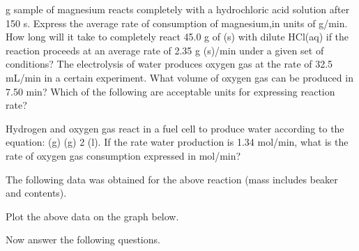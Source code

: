 \documentclass[fleqn]{exam}
\begin{document}
\begin{questions}
   g sample of magnesium reacts completely with a hydrochloric acid solution after 150 s. Express the average rate of consumption of magnesium,in units of g/min.
  \vspace{1in}
  \question How long will it take to completely react 45.0 g of (s) with dilute HCl(aq) if the reaction proceeds at an average rate of 2.35 g (s)/min under a given set of conditions?
  \vspace{1in}
  \question The electrolysis of water produces oxygen gas at the rate of 32.5 mL/min in a certain experiment. What volume of oxygen gas can be produced in 7.50 min?
  \vspace{1in}
  \question Which of the following are acceptable units for expressing reaction rate?

  \question Hydrogen and oxygen gas react in a fuel cell to produce water according to the equation:
  \newline
   (g) \+ (g) \arrow{->} 2 (l).
  \schemestop
  \newline
  If the rate water production is 1.34 mol/min, what is the rate of oxygen gas consumption expressed in mol/min?
  \vspace{1in}

  \newpage

  \question
  The following data was obtained for the above reaction (mass includes beaker and contents).


  Plot the above data on the graph below.

  \vspace{2in}

  Now answer the following questions.

  \begin{parts}

\end{parts}
\end{questions}
\end{document}
